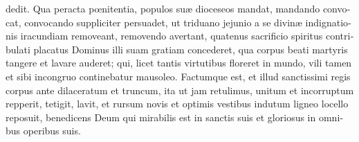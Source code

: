 \documentclass[10pt]{book}
\begin{document}
\begin{paracol}{2}
\begin{otherlanguage}{latin}
dedit. Qua peracta p\oe{}nitentia, populos su\ae{} dioceseos mandat, mandando convocat, convocando suppliciter persuadet, ut triduano jejunio a se divin\ae{} indignationis iracundiam removeant, removendo avertant, quatenus sacrificio spiritus contribulati placatus Dominus illi suam gratiam concederet, qua corpus beati martyris tangere et lavare auderet; qui, licet tantis virtutibus floreret in mundo, vili tamen et sibi incongruo continebatur mausoleo. Factumque est, et illud sanctissimi regis corpus ante dilaceratum et truncum, ita ut jam retulimus, unitum et incorruptum repperit, tetigit, lavit, et rursum novis et optimis vestibus indutum ligneo locello reposuit, benedicens Deum qui mirabilis est in sanctis suis et gloriosus in omnibus operibus suis.
\end{otherlanguage}

\switchcolumn


\end{paracol}
\end{document}
